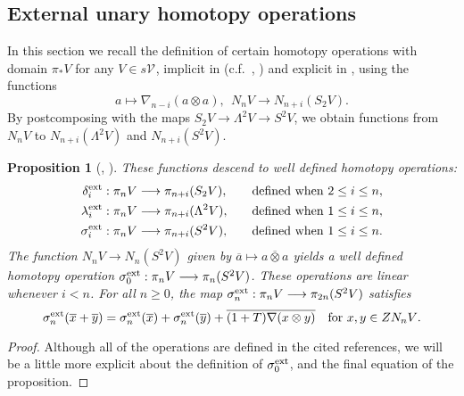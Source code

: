 \documentclass[11pt]{amsart} \renewcommand{\baselinestretch}{1.2}
\theoremstyle{plain}
\newtheorem{prop}[thm]{Proposition}
\numberwithin{equation}{section} %
\theoremstyle{plain}
\newtheorem{prop}[thm]{Proposition}
\numberwithin{equation}{chapter} %
\let\oldphi\phi
\let\phi\varphi
\renewcommand{\to}{\longrightarrow}
\newcommand{\calV}{\mathcal{V}}
\newcommand{\citeBOX}[2][]{\cite[\mbox{#1}]{#2}}
\newcommand{\vect}[2]{\calV^{#1}_{#2}}
\newcommand{\Nabla}{\nabla}
\renewcommand{\mapsto}{\longmapsto}
\newcommand{\SubsectionOrSection}[1]{\subsection{#1}}
\begin{document}
\begin{Constructing homotopy operations}
\SubsectionOrSection{External unary homotopy operations}\label{External unary homotopy operations}
In this section we recall the definition of certain homotopy operations with domain $\pi_*V$ for any $V\in s\vect{}{}$, implicit in \citeBOX[\S4]{DwyerHtpyOpsSimpComAlg.pdf} (c.f.\ \cite{BousOpnsDerFun.pdf,BousHomogFunctors.pdf}, \cite{CartanDivSquares}) and explicit in 
\citeBOX[\S3]{MR1089001}, using the functions
\[a \mapsto \Nabla_{n-i}(a\otimes a),\ \ N_nV \to N_{n+i}(S_2V).\]
By postcomposing with the maps $S_2V\to \Lambda^{2}V\to S^2V$, we obtain functions from $N_nV$ to $N_{n+i}(\Lambda^2V)$ and $N_{n+i}(S^2V)$.
\begin{prop}[{\cite[Lemma 4.1]{DwyerHtpyOpsSimpComAlg.pdf}, \citeBOX[\S3]{MR1089001}}]
\label{extUnaryHomotOps}
These functions descend to  well defined homotopy operations:
\begin{alignat*}{2}
\delta_i^\textup{ext}:\pi_nV&\to \pi_{n+i}(S_2V),&\quad&\textup{defined when }2\leq i\leq n,\\
\lambda_i^\textup{ext}:\pi_nV&\to \pi_{n+i}(\Lambda^2V),&\quad&\textup{defined when }1\leq i\leq n,\\
\sigma_i^\textup{ext}:\pi_nV&\to \pi_{n+i}(S^2V),&\quad&\textup{defined when }1\leq i\leq n.
\end{alignat*}
The function $N_nV \to N_{n}(S^2V)$ given by $\overline{a}\mapsto \overline{a\otimes a}$ yields a well defined homotopy operation $\sigma_0^\textup{ext}:\pi_nV\to \pi_{n}(S^2V)$. 
These operations are linear whenever $i< n$. For all $n\geq0$, the map $\sigma_n^\textup{ext}:\pi_nV\to\pi_{2n}(S^2V)$ satisfies
\[\sigma_n^\textup{ext}(\overline{x}+\overline{y})=\sigma_n^\textup{ext}(\overline{x})+\sigma_n^\textup{ext}(\overline{y})+\overline{(1+T)\Nabla(x\otimes y)}\quad\text{for $x,y\in ZN_nV$}.\]
\end{prop}
\begin{proof}
Although all of the operations  are defined in the cited references, we will be a little more explicit about the definition of $\sigma^\textup{ext}_0$, and the final equation of the proposition.


\end{proof}
\end{Constructing homotopy operations}
\end{document}
